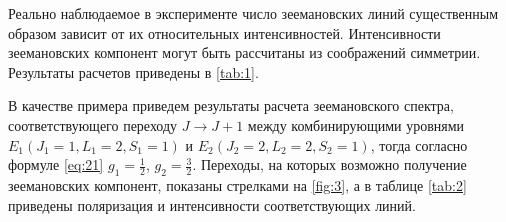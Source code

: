 Реально наблюдаемое в эксперименте число зеемановских линий существенным образом зависит от их относительных интенсивностей. Интенсивности зеемановских компонент могут быть рассчитаны из соображений симметрии. Результаты расчетов приведены в \ref{tab:1}.

В качестве примера приведем результаты расчета зеемановского спектра, соответствующего переходу 
$J\rightarrow J+1$
 между комбинирующими уровнями 
 $E_1(J_1=1,L_1=2,S_1=1)$ и $E_2(J_2=2,L_2=2,S_2=1)$,
  тогда согласно формуле \ref{eq:21} 
  $g_1=\frac12$, $g_2=\frac32$. 
  Переходы, на которых возможно получение зеемановских компонент, показаны стрелками на \ref{fig:3}, а в таблице \ref{tab:2} приведены поляризация и интенсивности соответствующих линий. 


